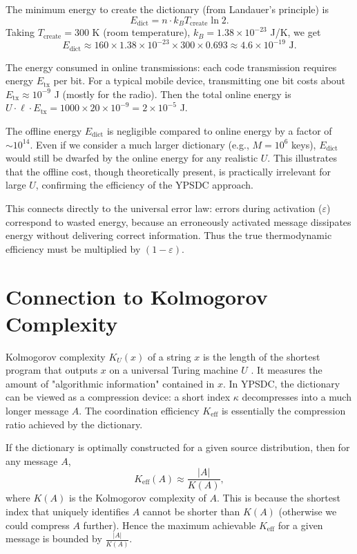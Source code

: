 \documentclass[12pt,a4paper]{article}
\theoremstyle{remark}
\newcommand{\Keff}{K_{\mathrm{eff}}}
\begin{document}
	The minimum energy to create the dictionary (from Landauer's principle) is
	\[
	E_{\text{dict}} = n \cdot k_B T_{\text{create}} \ln 2.
	\]
	Taking $T_{\text{create}} = 300$ K (room temperature), $k_B = 1.38 \times 10^{-23}$ J/K, we get
	\[
	E_{\text{dict}} \approx 160 \times 1.38 \times 10^{-23} \times 300 \times 0.693 \approx 4.6 \times 10^{-19} \text{ J}.
	\]
	
	The energy consumed in online transmissions: each code transmission requires energy $E_{\text{tx}}$ per bit. For a typical mobile device, transmitting one bit costs about $E_{\text{tx}} \approx 10^{-9}$ J (mostly for the radio). Then the total online energy is $U \cdot \ell \cdot E_{\text{tx}} = 1000 \times 20 \times 10^{-9} = 2 \times 10^{-5}$ J.
	
	The offline energy $E_{\text{dict}}$ is negligible compared to online energy by a factor of $\sim 10^{14}$. Even if we consider a much larger dictionary (e.g., $M = 10^6$ keys), $E_{\text{dict}}$ would still be dwarfed by the online energy for any realistic $U$. This illustrates that the offline cost, though theoretically present, is practically irrelevant for large $U$, confirming the efficiency of the YPSDC approach.
	
	This connects directly to the universal error law: errors during activation ($\varepsilon$) correspond to wasted energy, because an erroneously activated message dissipates energy without delivering correct information. Thus the true thermodynamic efficiency must be multiplied by $(1-\varepsilon)$.
	
	\section{Connection to Kolmogorov Complexity}
	\label{sec:kolmogorov}
	
	Kolmogorov complexity $K_U(x)$ of a string $x$ is the length of the shortest program that outputs $x$ on a universal Turing machine $U$ \cite{Kolmogorov1965}. It measures the amount of "algorithmic information" contained in $x$. In YPSDC, the dictionary can be viewed as a compression device: a short index $\kappa$ decompresses into a much longer message $A$. The coordination efficiency $\Keff$ is essentially the compression ratio achieved by the dictionary.
	
	If the dictionary is optimally constructed for a given source distribution, then for any message $A$,
	\begin{equation}
		\Keff(A) \approx \frac{|A|}{K(A)}, \label{eq:kolmogorov}
	\end{equation}
	where $K(A)$ is the Kolmogorov complexity of $A$. This is because the shortest index that uniquely identifies $A$ cannot be shorter than $K(A)$ (otherwise we could compress $A$ further). Hence the maximum achievable $\Keff$ for a given message is bounded by $\frac{|A|}{K(A)}$.
	
\end{document}
